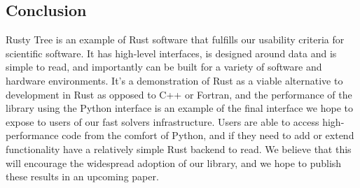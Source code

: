 \subsection*{Conclusion}

Rusty Tree is an example of Rust software that fulfills our usability criteria for scientific software. It has high-level interfaces, is designed around data and is simple to read, and importantly can be built for a variety of software and hardware environments. It's a demonstration of Rust as a viable alternative to development in Rust as opposed to C++ or Fortran, and the performance of the library using the Python interface is an example of the final interface we hope to expose to users of our fast solvers infrastructure. Users are able to access high-performance code from the comfort of Python, and if they need to add or extend functionality have a relatively simple Rust backend to read. We believe that this will encourage the widespread adoption of our library, and we hope to publish these results in an upcoming paper.
